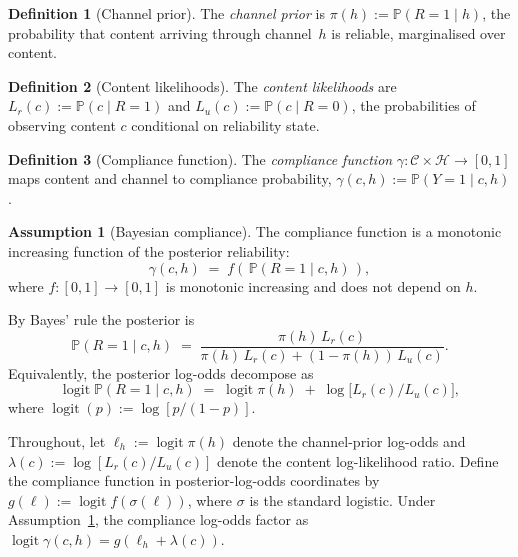 \documentclass[11pt]{article}
\theoremstyle{definition}
\newtheorem{definition}{Definition}
\newtheorem{assumption}{Assumption}
\theoremstyle{remark}
\begin{document}
\begin{definition}[Channel prior]
\label{def:channel-prior}
The \emph{channel prior} is $\pi(h) := \mathbb{P}(R = 1 \mid h)$, the probability
that content arriving through channel~$h$ is reliable, marginalised over content.
\end{definition}

\begin{definition}[Content likelihoods]
\label{def:content-likelihoods}
The \emph{content likelihoods} are $L_r(c) := \mathbb{P}(c \mid R=1)$ and
$L_u(c) := \mathbb{P}(c \mid R=0)$, the probabilities of observing content $c$
conditional on reliability state.
\end{definition}

\begin{definition}[Compliance function]
\label{def:compliance}
The \emph{compliance function} $\gamma : \mathcal{C} \times \mathcal{H} \to [0,1]$
maps content and channel to compliance probability,
$\gamma(c, h) := \mathbb{P}(Y=1 \mid c, h)$.
\end{definition}

\begin{assumption}[Bayesian compliance]
\label{ass:bayes}
The compliance function is a monotonic increasing function of the posterior
reliability:
\[
\gamma(c, h) \;=\; f\!\left(\, \mathbb{P}(R=1 \mid c, h) \,\right),
\]
where $f : [0,1] \to [0,1]$ is monotonic increasing and does not depend on $h$.
\end{assumption}

By Bayes' rule the posterior is
\begin{equation}
\label{eq:posterior}
\mathbb{P}(R=1 \mid c, h) \;=\; \frac{\pi(h)\, L_r(c)}{\pi(h)\, L_r(c) + (1-\pi(h))\, L_u(c)}.
\end{equation}
Equivalently, the posterior log-odds decompose as
\begin{equation}
\label{eq:posterior-logodds}
\operatorname{logit} \mathbb{P}(R=1 \mid c, h) \;=\; \operatorname{logit} \pi(h) \;+\; \log\!\bigl[L_r(c) / L_u(c)\bigr],
\end{equation}
where $\operatorname{logit}(p) := \log[p/(1-p)]$.

Throughout, let $\ell_h := \operatorname{logit} \pi(h)$ denote the channel-prior
log-odds and $\lambda(c) := \log[L_r(c)/L_u(c)]$ denote the content log-likelihood
ratio. Define the compliance function in posterior-log-odds coordinates by
$g(\ell) := \operatorname{logit} f(\sigma(\ell))$, where $\sigma$ is the standard logistic.
Under Assumption~\ref{ass:bayes}, the compliance log-odds factor as
$\operatorname{logit} \gamma(c, h) = g(\ell_h + \lambda(c))$.
\end{document}

